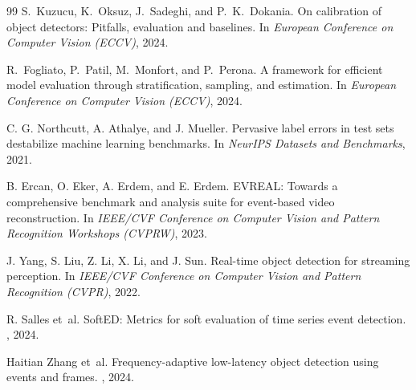 \documentclass[10pt,twocolumn,letterpaper]{article}
\begin{document}
{\begin{thebibliography}{99}
S.~Kuzucu, K.~Oksuz, J.~Sadeghi, and P.~K.~Dokania.
\newblock On calibration of object detectors: Pitfalls, evaluation and baselines.
\newblock In {\em European Conference on Computer Vision (ECCV)}, 2024.

R.~Fogliato, P.~Patil, M.~Monfort, and P.~Perona.
\newblock A framework for efficient model evaluation through stratification, sampling, and
estimation.
\newblock In {\em European Conference on Computer Vision (ECCV)}, 2024.

C. G. Northcutt, A. Athalye, and J. Mueller.
\newblock Pervasive label errors in test sets destabilize machine learning
benchmarks.
\newblock In {\em NeurIPS Datasets and Benchmarks}, 2021.

B. Ercan, O. Eker, A. Erdem, and E. Erdem.
\newblock EVREAL: Towards a comprehensive benchmark and analysis suite for
event-based video reconstruction.
\newblock In {\em IEEE/CVF Conference on Computer Vision and Pattern Recognition
Workshops (CVPRW)}, 2023.

J. Yang, S. Liu, Z. Li, X. Li, and J. Sun.
\newblock Real-time object detection for streaming perception.
\newblock In {\em IEEE/CVF Conference on Computer Vision and Pattern Recognition
(CVPR)}, 2022.

R. Salles et~al.
SoftED: Metrics for soft evaluation of time series event detection.
, 2024.

Haitian Zhang et~al.
Frequency-adaptive low-latency object detection using events and frames.
, 2024.

\end{thebibliography}
}
\end{document}
